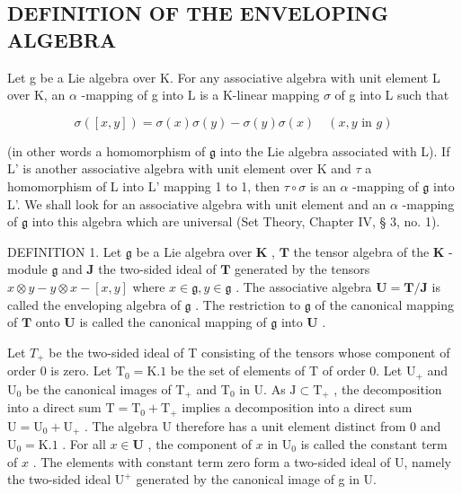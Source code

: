 \subsection{DEFINITION OF THE ENVELOPING ALGEBRA}

Let g be a Lie algebra over K. For any associative algebra with unit element L over K, an \(\alpha\) -mapping of g into L is a K-linear mapping \(\sigma\) of g into L such that

\[
\sigma ([ x, y ]) = \sigma (x) \sigma (y) - \sigma (y) \sigma (x) \quad (x, y \text {   in   } g)
\]

(in other words a homomorphism of \(\mathfrak{g}\) into the Lie algebra associated with L). If L' is another associative algebra with unit element over K and \(\tau\) a homomorphism of L into L' mapping 1 to 1, then \(\tau \circ \sigma\) is an \(\alpha\) -mapping of \(\mathfrak{g}\) into L'. We shall look for an associative algebra with unit element and an \(\alpha\) -mapping of \(\mathfrak{g}\) into this algebra which are universal (Set Theory, Chapter IV, § 3, no. 1).

DEFINITION 1. Let \(\mathfrak{g}\) be a Lie algebra over \(\mathbf{K}\) , \(\mathbf{T}\) the tensor algebra of the \(\mathbf{K}\) -module \(\mathfrak{g}\) and \(\mathbf{J}\) the two-sided ideal of \(\mathbf{T}\) generated by the tensors \(x \otimes y - y \otimes x - [x, y]\) where \(x \in \mathfrak{g}, y \in \mathfrak{g}\) . The associative algebra \(\mathbf{U} = \mathbf{T} / \mathbf{J}\) is called the enveloping algebra of \(\mathfrak{g}\) . The restriction to \(\mathfrak{g}\) of the canonical mapping of \(\mathbf{T}\) onto \(\mathbf{U}\) is called the canonical mapping of \(\mathfrak{g}\) into \(\mathbf{U}\) .

Let \(T_{+}\) be the two-sided ideal of T consisting of the tensors whose component of order 0 is zero. Let \(\mathrm{T}_0 = \mathrm{K}.1\) be the set of elements of T of order 0. Let \(\mathrm{U}_{+}\) and \(\mathrm{U}_0\) be the canonical images of \(\mathrm{T}_{+}\) and \(\mathrm{T}_0\) in U. As \(\mathrm{J} \subset \mathrm{T}_{+}\) , the decomposition into a direct sum \(\mathrm{T} = \mathrm{T}_0 + \mathrm{T}_{+}\) implies a decomposition into a direct sum \(\mathrm{U} = \mathrm{U}_0 + \mathrm{U}_{+}\) . The algebra U therefore has a unit element distinct from 0 and \(\mathrm{U}_0 = \mathrm{K}.1\) . For all \(x \in \mathbf{U}\) , the component of \(x\) in \(\mathrm{U}_0\) is called the constant term of \(x\) . The elements with constant term zero form a two-sided ideal of U, namely the two-sided ideal \(\mathrm{U}^{+}\) generated by the canonical image of g in U.

